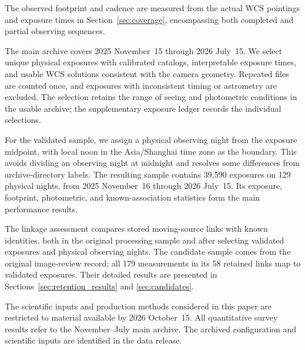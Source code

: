 The observed footprint and cadence are measured from the actual WCS
pointings and exposure times in Section~\ref{sec:coverage}, encompassing
both completed and partial observing sequences.

\label{sec:cohorts}

The main archive covers 2025 November~15 through 2026 July~15. We select
unique physical exposures with calibrated catalogs, interpretable
exposure times, and usable WCS solutions consistent with the camera
geometry. Repeated files are counted once, and exposures with
inconsistent timing or astrometry are excluded. The selection retains
the range of seeing and photometric conditions in the usable archive;
the supplementary exposure ledger records the individual selections.

For the validated sample, we assign a physical observing night from the
exposure midpoint, with local noon in the Asia/Shanghai time zone as the
boundary. This avoids dividing an observing night at midnight and
resolves some differences from archive-directory labels. The resulting
sample contains 39,590 exposures on 129 physical nights, from 2025
November~16 through 2026 July~15. Its exposure, footprint, photometric,
and known-association statistics form the main performance results.

The linkage assessment compares stored moving-source links with known
identities, both in the original processing sample and after selecting
validated exposures and physical observing nights. The candidate sample
comes from the original image-review record; all 179 measurements in
its 58 retained links map to validated exposures. Their detailed results
are presented in Sections~\ref{sec:retention_results} and
\ref{sec:candidates}.

The scientific inputs and production methods considered in this paper
are restricted to material available by 2026 October~15. All quantitative
survey results refer to the November--July main archive. The archived
configuration and scientific inputs are identified in the data release.
